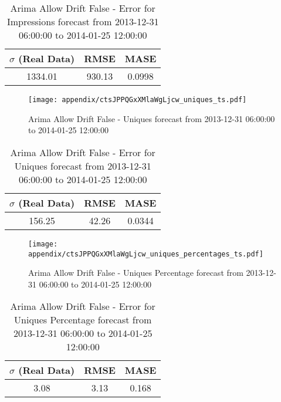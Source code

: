 \begin{table}[H]
\centering
\footnotesize
\begin{tabular}{ccc}
$\sigma$ (Real Data) & RMSE & MASE   \\ \hline
1334.01 & 930.13 & 0.0998 \\
\end{tabular}

\vspace{0.5cm}

\caption{
Arima Allow Drift False - Error for Impressions forecast from 2013-12-31 06:00:00 to 2014-01-25 12:00:00}
\end{table}

\begin{figure}[H] \begin{center} \leavevmode
\texttt{[image: appendix/ctsJPPQGxXMlaWgLjcw\_uniques\_ts.pdf]} \caption{
Arima Allow Drift False - Uniques forecast from 2013-12-31 06:00:00 to 2014-01-25 12:00:00} \label{fig:appendix/ctsJPPQGxXMlaWgLjcw_uniques_ts.pdf} \end{center}
\end{figure}

\begin{table}[H]
\centering
\footnotesize
\begin{tabular}{ccc}
$\sigma$ (Real Data) & RMSE & MASE   \\ \hline
156.25 & 42.26 & 0.0344 \\
\end{tabular}

\vspace{0.5cm}

\caption{
Arima Allow Drift False - Error for Uniques forecast from 2013-12-31 06:00:00 to 2014-01-25 12:00:00}
\end{table}

\begin{figure}[H] \begin{center} \leavevmode
\texttt{[image: appendix/ctsJPPQGxXMlaWgLjcw\_uniques\_percentages\_ts.pdf]} \caption{
Arima Allow Drift False - Uniques Percentage forecast from 2013-12-31 06:00:00 to 2014-01-25 12:00:00} \label{fig:appendix/ctsJPPQGxXMlaWgLjcw_uniques_percentages_ts.pdf} \end{center}
\end{figure}

\begin{table}[H]
\centering
\footnotesize
\begin{tabular}{ccc}
$\sigma$ (Real Data) & RMSE & MASE   \\ \hline
3.08 & 3.13 & 0.168 \\
\end{tabular}

\vspace{0.5cm}

\caption{
Arima Allow Drift False - Error for Uniques Percentage forecast from 2013-12-31 06:00:00 to 2014-01-25 12:00:00}
\end{table}


